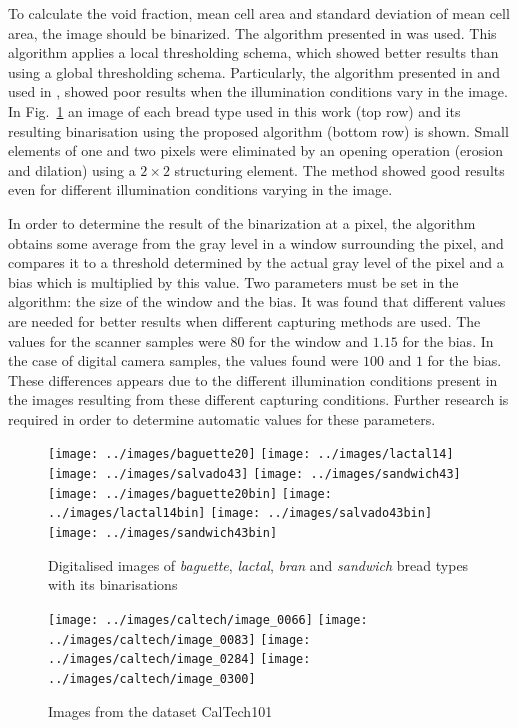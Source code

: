 To calculate the void fraction, mean cell area and standard deviation of mean cell area, the image should be binarized. The algorithm presented in \cite{White83} was used. This algorithm applies a local thresholding schema, which showed better results than using a global thresholding schema. Particularly, the algorithm presented in \cite{Huang95} and used in \cite{Gonzales2008}, showed poor results when the illumination conditions vary in the image. In Fig.~\ref{fig:bread} an image of each bread type used in this work (top row) and its resulting binarisation using the proposed algorithm (bottom row) is shown. Small elements of one and two pixels were eliminated by an opening operation (erosion and dilation) using a $2\times2$ structuring element. The method showed good results even for different illumination conditions varying in the image. 

In order to determine the result of the binarization at a pixel, the algorithm obtains some average from the gray level in a window surrounding the pixel, and compares it to a threshold determined by the actual gray level of the pixel and a bias which is multiplied by this value. Two parameters must be set in the algorithm: the size of the window and the bias. It was found that different values are needed for better results when different capturing methods are used. The values for the scanner samples were $80$ for the window and $1.15$ for the bias. In the case of digital camera samples, the values found were $100$ and $1$ for the bias. These differences appears due to the different illumination conditions present in the images resulting from these different capturing conditions. Further research is required in order to determine automatic values for these parameters.

\begin{figure}[htb]
\centering
\texttt{[image: ../images/baguette20]}
\texttt{[image: ../images/lactal14]}
\texttt{[image: ../images/salvado43]}
\texttt{[image: ../images/sandwich43]}
\texttt{[image: ../images/baguette20bin]}
\texttt{[image: ../images/lactal14bin]}
\texttt{[image: ../images/salvado43bin]}
\texttt{[image: ../images/sandwich43bin]}
\caption{Digitalised images of {\em baguette}, {\em lactal}, {\em bran} and {\em sandwich} bread types with its binarisations}
\label{fig:bread}
\end{figure}

\begin{figure}[htb]
\centering
\texttt{[image: ../images/caltech/image\_0066]}
\texttt{[image: ../images/caltech/image\_0083]}
\texttt{[image: ../images/caltech/image\_0284]}
\texttt{[image: ../images/caltech/image\_0300]}
\caption{Images from the dataset CalTech101}
\label{fig:nonbread}
\end{figure}

